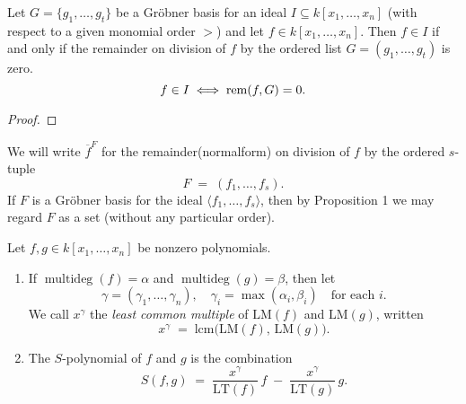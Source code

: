 \begin{corollary}
    \label{cor:GB_membership_test} %
    \leanok
    Let $G = \{g_1, \dots , g_t\}$ be a Gr{\"o}bner basis for an ideal $I \subseteq k[x_1, \dots , x_n]$
    (with respect to a given monomial order $>$) and let $f \in k[x_1, \dots , x_n]$.
    Then $f \in I$ if and only if the remainder on division of $f$ by the ordered list
    $G = (g_1, \dots, g_t)$ is zero.
    \[ f \in I \iff \operatorname{rem}(f, G) = 0. \]
\end{corollary}
\begin{proof}
  \leanok %
\end{proof}

\begin{definition}\label{def:Remainder} %
    \leanok %
    We will write \(\overline{f}^F\) for the remainder(normalform) on division of \(f\) by the ordered \(s\)-tuple
    \[
    F \;=\;(f_1,\dots,f_s).
    \]
    If \(F\) is a Gr{\"o}bner basis for the ideal \(\langle f_1,\dots,f_s\rangle\), then by Proposition 1
    we may regard \(F\) as a set (without any particular order).
\end{definition}

\begin{definition}\label{def:S-polynomial} %
    \leanok %
    Let \(f,g\in k[x_1,\dots,x_n]\) be nonzero polynomials.
    \begin{enumerate}
      \item If \(\operatorname{multideg}(f)=\alpha\) and \(\operatorname{multideg}(g)=\beta\), 
        then let 
        \[
          \gamma = (\gamma_1,\dots,\gamma_n),
          \quad
          \gamma_i = \max(\alpha_i,\beta_i)
          \quad\text{for each }i.
        \]
        We call \(x^\gamma\) the \emph{least common multiple} of \(\mathrm{LM}(f)\) and \(\mathrm{LM}(g)\),
        written
        \[
          x^\gamma \;=\;\mathrm{lcm}\bigl(\mathrm{LM}(f),\,\mathrm{LM}(g)\bigr).
        \]
      \item The \(S\)-polynomial of \(f\) and \(g\) is the combination
        \[
          S(f,g)
          \;=\;
          \frac{x^\gamma}{\mathrm{LT}(f)}\,f
          \;-\;
          \frac{x^\gamma}{\mathrm{LT}(g)}\,g.
        \]
    \end{enumerate}
\end{definition}

